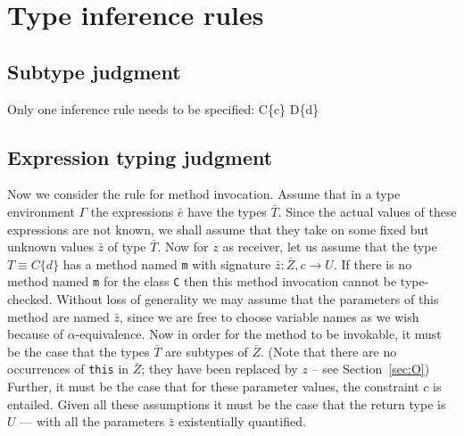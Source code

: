 \section{Type inference rules}
\subsection{Subtype judgment}

Only one inference rule needs to be specified:
{\Gamma \vdash C\{c\} \subtype D\{d\}}

\subsection{Expression typing judgment}

Now we consider the rule for method invocation. Assume that in a type
environment $\Gamma$ the expressions $\bar{e}$ have the types
$\bar{T}$. Since the actual values of these expressions are not known,
we shall assume that they take on some fixed but unknown values
$\bar{z}$ of type $\bar{T}$.  Now for $z$ as receiver, let us assume
that the type $T\equiv C\{d\}$ has a method named {\tt m} with
signature $\bar{z}: \bar{Z}, c \rightarrow U$.  If there is no method
named {\tt m} for the class {\tt C} then this method invocation cannot
be type-checked. Without loss of generality we may assume that the
parameters of this method are named $\bar{z}$, since we are free to
choose variable names as we wish because of $\alpha$-equivalence. Now
in order for the method to be invokable, it must be the case that the
types $\bar{T}$ are subtypes of $\bar{Z}$. (Note that there are no
occurrences of {\tt this} in $\bar{Z}$; they have been replaced by
$z$ -- see Section~\ref{sec:O}) Further, it must be the case that for these parameter values,
the constraint $c$ is entailed. Given all these assumptions it must be
the case that the return type is $U$ --- with all the parameters
$\bar{z}$ existentially quantified.

